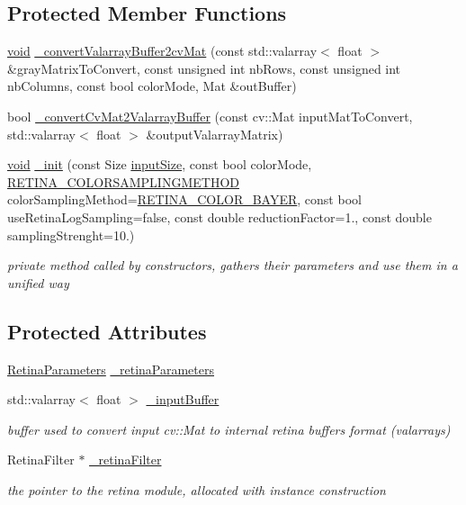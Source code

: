 \subsection*{Protected Member Functions}
\begin{DoxyCompactItemize}
\item 
\hyperlink{legacy_8hpp_a8bb47f092d473522721002c86c13b94e}{void} \hyperlink{classcv_1_1Retina_a0221dac8a0e6222ad15cef85ea60ca33}{\-\_\-convert\-Valarray\-Buffer2cv\-Mat} (const std\-::valarray$<$ float $>$ \&gray\-Matrix\-To\-Convert, const unsigned int nb\-Rows, const unsigned int nb\-Columns, const bool color\-Mode, Mat \&out\-Buffer)
\item 
bool \hyperlink{classcv_1_1Retina_a411c66889d31acddba2a9792d6bb749d}{\-\_\-convert\-Cv\-Mat2\-Valarray\-Buffer} (const cv\-::\-Mat input\-Mat\-To\-Convert, std\-::valarray$<$ float $>$ \&output\-Valarray\-Matrix)
\item 
\hyperlink{legacy_8hpp_a8bb47f092d473522721002c86c13b94e}{void} \hyperlink{classcv_1_1Retina_acae9793996be1420f7902daeb752c8f0}{\-\_\-init} (const Size \hyperlink{classcv_1_1Retina_ad9a6308217d6ca48a644b046d4e2d97e}{input\-Size}, const bool color\-Mode, \hyperlink{namespacecv_a1009b8eb0eac217a128fb5752f887287}{R\-E\-T\-I\-N\-A\-\_\-\-C\-O\-L\-O\-R\-S\-A\-M\-P\-L\-I\-N\-G\-M\-E\-T\-H\-O\-D} color\-Sampling\-Method=\hyperlink{namespacecv_a1009b8eb0eac217a128fb5752f887287ae25654a2d7593d5c498cc9229374895a}{R\-E\-T\-I\-N\-A\-\_\-\-C\-O\-L\-O\-R\-\_\-\-B\-A\-Y\-E\-R}, const bool use\-Retina\-Log\-Sampling=false, const double reduction\-Factor=1., const double sampling\-Strenght=10.)
\begin{DoxyCompactList}\small\item\em private method called by constructors, gathers their parameters and use them in a unified way \end{DoxyCompactList}\end{DoxyCompactItemize}
\subsection*{Protected Attributes}
\begin{DoxyCompactItemize}
\item 
\hyperlink{structcv_1_1Retina_1_1RetinaParameters}{Retina\-Parameters} \hyperlink{classcv_1_1Retina_a2ef9ec525730aadb05194240c764e672}{\-\_\-retina\-Parameters}
\item 
std\-::valarray$<$ float $>$ \hyperlink{classcv_1_1Retina_a542455a8c72e81b50c8344754d1a82b4}{\-\_\-input\-Buffer}
\begin{DoxyCompactList}\small\item\em buffer used to convert input cv\-::\-Mat to internal retina buffers format (valarrays) \end{DoxyCompactList}\item 
Retina\-Filter $\ast$ \hyperlink{classcv_1_1Retina_a3e16987f0a0134ac1a597c59fa0ce1e0}{\-\_\-retina\-Filter}
\begin{DoxyCompactList}\small\item\em the pointer to the retina module, allocated with instance construction \end{DoxyCompactList}\end{DoxyCompactItemize}


